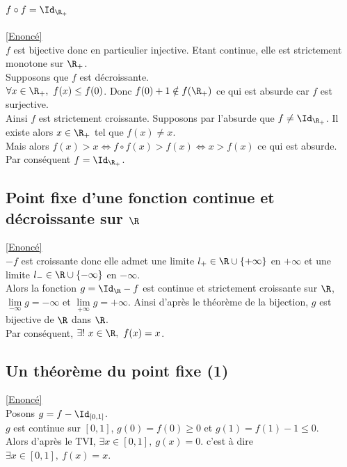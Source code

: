 \documentclass{book}
\begin{document}
	\subsection{$f\circ f=\Id_{\R_+}$ }
	\label{fof=Id corrigé}
	\textcolor{blue}{\hyperref[fof=Id]{[Enoncé]}}\\
	$f$ est bijective donc en particulier injective. Etant continue, elle est strictement monotone sur $\R_+$.\\
	Supposons que $f$ est décroissante.\\
	$\forall x\in \R_+,\ f(x)\leq f(0)$. Donc $f(0)+1\notin f(\R_+)$ ce qui est absurde car $f$ est surjective.\\
	Ainsi $f$ est strictement croissante. Supposons par l'absurde que $f\ne \Id_{\R_+}$. Il existe alors $x\in \R_+$ tel que $f(x)\ne x$.\\
	Mais alors $f(x)>x\iff f\circ f(x)>f(x)\iff x>f(x)$ ce qui est absurde.\\
	Par conséquent $f=\Id_{\R_+}$.
	
	\subsection{Point fixe d'une fonction continue et décroissante sur $\R$ }
	\label{Point fixe d'une fonction continue et décroissante sur  R corrigé}
	\textcolor{blue}{\hyperref[Point fixe d'une fonction continue et décroissante sur R]{[Enoncé]}}\\
	$-f$ est croissante donc elle admet une limite $l_+\in \R\cup\{+\infty\}$ en $+\infty$ et une limite $l_-\in \R\cup\{-\infty\}$ en $-\infty$.\\
	Alors la fonction $g=\Id_\R-f$ est continue et strictement croissante sur $\R$, $\lim\limits_{-\infty}g=-\infty$ et $\lim\limits_{+\infty}g=+\infty$. Ainsi d'après le théorème de la bijection, $g$ est bijective de $\R$ dans $\R$.\\
	Par conséquent, $\exists!\ x\in \R,\ f(x)=x$.
	
	\subsection{Un théorème du point fixe (1) }
	\label{Un théorème du point fixe (1) corrigé}
	\textcolor{blue}{\hyperref[Un théorème du point fixe (1)]{[Enoncé]}}\\
	Posons $g=f-\Id_{[0,1]}$.\\
	$g$ est continue sur $[0,1]$, $g(0)=f(0)\geq 0$ et $g(1)=f(1)-1\leq 0$.\\
	Alors d'après le TVI, $\exists x\in [0,1],\ g(x)=0$. c'est à dire $\exists x\in [0,1],\ f(x)=x$.
	
\end{document}
